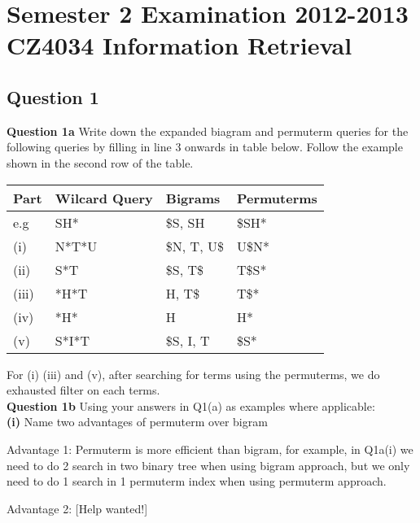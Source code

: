 \documentclass[11pt,a4paper]{report}
\begin{document}
\chapter{Semester 2 Examination 2012-2013\\CZ4034 Information Retrieval}
\begin{multicols*}{2}

\section{Question 1}

\noindent \textbf{Question 1a} Write down the expanded biagram and permuterm queries for the following queries by filling in line 3 onwards in table below. Follow the example shown in the second row of the table.

\begin{center}
\begin{tabular}{| l | l | l | l |}
    \hline
    Part      & Wilcard Query & Bigrams    & Permuterms \\
    \hline
    e.g       & SH*           & \$S, SH     & \$SH* \\
    (i)       & N*T*U         & \$N, T, U\$ & U\$N* \\
    (ii)      & S*T           & \$S, T\$    & T\$S* \\
    (iii)     & *H*T          & H, T\$      & T\$*  \\
    (iv)      & *H*           & H           & H*    \\
    (v)       & S*I*T         & \$S, I, T   & \$S*  \\
    \hline
\end{tabular}
\end{center}

\noindent For (i) (iii) and (v), after searching for terms using the permuterms, we do exhausted filter on each terms.\\

\noindent \textbf{Question 1b} Using your answers in Q1(a) as examples where applicable: \\

\noindent \textbf{(i)} Name two advantages of permuterm over bigram

\noindent Advantage 1: Permuterm is more efficient than bigram, for example, in Q1a(i) we need to do 2 search in two binary tree when using bigram approach, but we only need to do 1 search in 1 permuterm index when using permuterm approach.

\noindent Advantage 2: [Help wanted!]\\


\end{multicols*}
\end{document}
